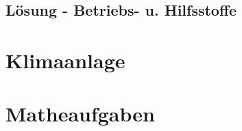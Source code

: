\section{Lösung - Betriebs- u. Hilfsstoffe}
 \newpage
\chapter{Klimaanlage}
 




\chapter{Matheaufgaben}
 \newpage
 \newpage




